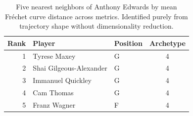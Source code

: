 \begin{table}[htbp]
  \centering\small
  \begin{tabular}{rllc}
    \toprule
    Rank & Player & Position & Archetype \\
    \midrule
    1 & Tyrese Maxey & G & 4 \\
    2 & Shai Gilgeous-Alexander & G & 4 \\
    3 & Immanuel Quickley & G & 4 \\
    4 & Cam Thomas & G & 4 \\
    5 & Franz Wagner & F & 4 \\
    \bottomrule
  \end{tabular}
  \caption{Five nearest neighbors of Anthony Edwards by mean Fr\'{e}chet curve distance across metrics. Identified purely from trajectory shape without dimensionality reduction.}
  \label{tab:Anthony_Edwards_frechet_curve_neighbors}
\end{table}

